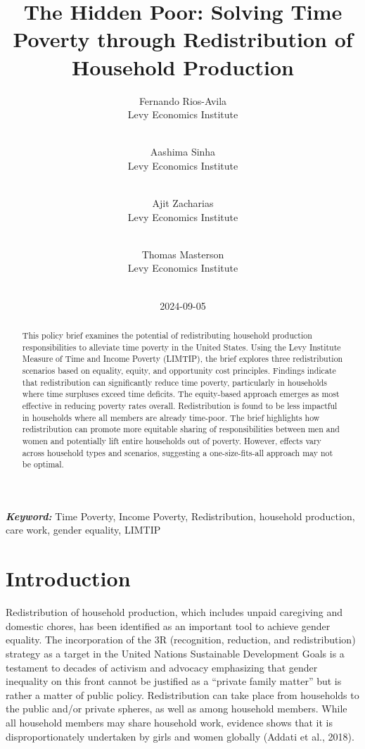 \documentclass[
  11pt,
]{article}
\title{The Hidden Poor: Solving Time Poverty through Redistribution of
Household Production}
\author{
Fernando Rios-Avila\\
Levy Economics Institute\\
\\
\and 
Aashima Sinha\\
Levy Economics Institute\\
\\
\and 
Ajit Zacharias\\
Levy Economics Institute\\
\\
\and 
Thomas Masterson\\
Levy Economics Institute\\
\\
}
\date{2024-09-05}
\begin{document}
\def\spacingset#1{\renewcommand{\baselinestretch}%
{#1}\small\normalsize} \spacingset{1}


\maketitle
\begin{abstract}
This policy brief examines the potential of redistributing household
production responsibilities to alleviate time poverty in the United
States. Using the Levy Institute Measure of Time and Income Poverty
(LIMTIP), the brief explores three redistribution scenarios based on
equality, equity, and opportunity cost principles. Findings indicate
that redistribution can significantly reduce time poverty, particularly
in households where time surpluses exceed time deficits. The
equity-based approach emerges as most effective in reducing poverty
rates overall. Redistribution is found to be less impactful in
households where all members are already time-poor. The brief highlights
how redistribution can promote more equitable sharing of
responsibilities between men and women and potentially lift entire
households out of poverty. However, effects vary across household types
and scenarios, suggesting a one-size-fits-all approach may not be
optimal.
\end{abstract}
 
\vspace{.2in}

\textbf{\textit{Keyword: }}Time Poverty, Income Poverty, Redistribution,
household production, care work, gender equality, LIMTIP


\thispagestyle{empty}
\clearpage{}
\newpage
\spacingset{1.2} %
\section{Introduction}\label{introduction}

Redistribution of household production, which includes unpaid caregiving
and domestic chores, has been identified as an important tool to achieve
gender equality. The incorporation of the 3R (recognition, reduction,
and redistribution) strategy as a target in the United Nations
Sustainable Development Goals is a testament to decades of activism and
advocacy emphasizing that gender inequality on this front cannot be
justified as a ``private family matter'' but is rather a matter of
public policy. Redistribution can take place from households to the
public and/or private spheres, as well as among household members. While
all household members may share household work, evidence shows that it
is disproportionately undertaken by girls and women globally (Addati et
al., 2018).
\end{document}
